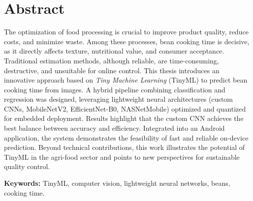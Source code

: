 \chapter*{Abstract}

The optimization of food processing is crucial to improve product quality, reduce costs, and minimize waste. Among these processes, bean cooking time is decisive, as it directly affects texture, nutritional value, and consumer acceptance. Traditional estimation methods, although reliable, are time-consuming, destructive, and unsuitable for online control. This thesis introduces an innovative approach based on \emph{Tiny Machine Learning} (TinyML) to predict bean cooking time from images. A hybrid pipeline combining classification and regression was designed, leveraging lightweight neural architectures (custom CNNs, MobileNetV2, EfficientNet-B0, NASNetMobile) optimized and quantized for embedded deployment. Results highlight that the custom CNN achieves the best balance between accuracy and efficiency. Integrated into an Android application, the system demonstrates the feasibility of fast and reliable on-device prediction. Beyond technical contributions, this work illustrates the potential of TinyML in the agri-food sector and points to new perspectives for sustainable quality control.

\vspace{0.5cm}
\noindent\textbf{Keywords:} TinyML, computer vision, lightweight neural networks, beans, cooking time.